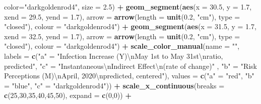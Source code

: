 \documentclass[
]{article}
\newenvironment{Shaded}{\begin{snugshade}}{\end{snugshade}}
\newcommand{\CharTok}[1]{\textcolor[rgb]{0.31,0.60,0.02}{#1}}
\newcommand{\DataTypeTok}[1]{\textcolor[rgb]{0.13,0.29,0.53}{#1}}
\newcommand{\DecValTok}[1]{\textcolor[rgb]{0.00,0.00,0.81}{#1}}
\newcommand{\FloatTok}[1]{\textcolor[rgb]{0.00,0.00,0.81}{#1}}
\newcommand{\KeywordTok}[1]{\textcolor[rgb]{0.13,0.29,0.53}{\textbf{#1}}}
\newcommand{\NormalTok}[1]{#1}
\newcommand{\OperatorTok}[1]{\textcolor[rgb]{0.81,0.36,0.00}{\textbf{#1}}}
\newcommand{\StringTok}[1]{\textcolor[rgb]{0.31,0.60,0.02}{#1}}
\begin{document}
\begin{Shaded}
\begin{Highlighting}[]
              \DataTypeTok{color=}\StringTok{"darkgoldenrod4"}\NormalTok{, }\DataTypeTok{size =} \FloatTok{2.5}\NormalTok{) }\OperatorTok{+}
\StringTok{  }\KeywordTok{geom_segment}\NormalTok{(}\KeywordTok{aes}\NormalTok{(}\DataTypeTok{x =} \FloatTok{30.5}\NormalTok{, }\DataTypeTok{y =} \FloatTok{1.7}\NormalTok{, }\DataTypeTok{xend =} \FloatTok{29.5}\NormalTok{, }\DataTypeTok{yend =} \FloatTok{1.7}\NormalTok{),}
                  \DataTypeTok{arrow =} \KeywordTok{arrow}\NormalTok{(}\DataTypeTok{length =} \KeywordTok{unit}\NormalTok{(}\FloatTok{0.2}\NormalTok{, }\StringTok{"cm"}\NormalTok{), }\DataTypeTok{type =} \StringTok{"closed"}\NormalTok{), }\DataTypeTok{colour =} \StringTok{"darkgoldenrod4"}\NormalTok{) }\OperatorTok{+}
\StringTok{  }\KeywordTok{geom_segment}\NormalTok{(}\KeywordTok{aes}\NormalTok{(}\DataTypeTok{x =} \FloatTok{31.5}\NormalTok{, }\DataTypeTok{y =} \FloatTok{1.7}\NormalTok{, }\DataTypeTok{xend =} \FloatTok{32.5}\NormalTok{, }\DataTypeTok{yend =} \FloatTok{1.7}\NormalTok{),}
                  \DataTypeTok{arrow =} \KeywordTok{arrow}\NormalTok{(}\DataTypeTok{length =} \KeywordTok{unit}\NormalTok{(}\FloatTok{0.2}\NormalTok{, }\StringTok{"cm"}\NormalTok{), }\DataTypeTok{type =} \StringTok{"closed"}\NormalTok{), }\DataTypeTok{colour =} \StringTok{"darkgoldenrod4"}\NormalTok{) }\OperatorTok{+}
\StringTok{  }\KeywordTok{scale_color_manual}\NormalTok{(}\DataTypeTok{name =} \StringTok{""}\NormalTok{, }\DataTypeTok{labels =} \KeywordTok{c}\NormalTok{(}\StringTok{"a"}\NormalTok{ =}\StringTok{ "Infection Increase (Y)}\CharTok{\textbackslash{}n}\StringTok{May 1st to May 31st}\CharTok{\textbackslash{}n}\StringTok{ratio, predicted"}\NormalTok{, }\StringTok{"c"}\NormalTok{ =}\StringTok{ "Instantaneous}\CharTok{\textbackslash{}n}\StringTok{Indirect Effect}\CharTok{\textbackslash{}n}\StringTok{(rate of change)"}\NormalTok{ , }\StringTok{"b"}\NormalTok{ =}\StringTok{ "Risk Perceptions (M)}\CharTok{\textbackslash{}n}\StringTok{April, 2020}\CharTok{\textbackslash{}n}\StringTok{predicted, centered"}\NormalTok{), }\DataTypeTok{values =} \KeywordTok{c}\NormalTok{(}\StringTok{"a"}\NormalTok{ =}\StringTok{ "red"}\NormalTok{, }\StringTok{"b"}\NormalTok{ =}\StringTok{ "blue"}\NormalTok{, }\StringTok{"c"}\NormalTok{ =}\StringTok{ "darkgoldenrod4"}\NormalTok{)) }\OperatorTok{+}
\StringTok{  }\KeywordTok{scale_x_continuous}\NormalTok{(}\DataTypeTok{breaks =} \KeywordTok{c}\NormalTok{(}\DecValTok{25}\NormalTok{,}\DecValTok{30}\NormalTok{,}\DecValTok{35}\NormalTok{,}\DecValTok{40}\NormalTok{,}\DecValTok{45}\NormalTok{,}\DecValTok{50}\NormalTok{), }\DataTypeTok{expand =} \KeywordTok{c}\NormalTok{(}\DecValTok{0}\NormalTok{,}\DecValTok{0}\NormalTok{)) }\OperatorTok{+}

\end{Highlighting}
\end{Shaded}
\end{document}
